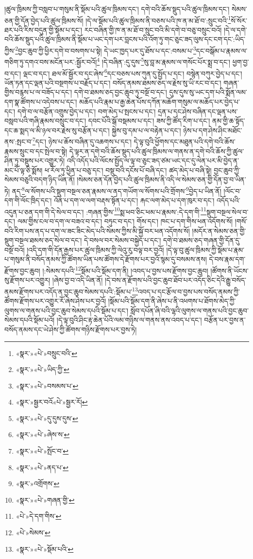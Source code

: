 །ཚུལ་ཁྲིམས་ཀྱི་བསླབ་པ་གསུམ་ནི་སྡོམ་པའི་ཚུལ་ཁྲིམས་དང་། དགེ་བའི་ཆོས་སྡུད་པའི་ཚུལ་ཁྲིམས་དང་། སེམས་ཅན་གྱི་དོན་བྱེད་པའི་ཚུལ་ཁྲིམས་སོ། །དེ་ལ་སྡོམ་པའི་ཚུལ་ཁྲིམས་ནི་བཅས་པའི་ཁ་ན་མ་ཐོ་བ་:སྲུང་བའི་\footnote{«སྣར་»«པེ་»བསྲུང་བའི་}སོ་སོར་ཐར་པའི་རིས་བདུན་གྱི་སྡོམ་པ་དང་། རང་བཞིན་གྱི་ཁ་ན་མ་ཐོ་བ་སྲུང་བའི་མི་དགེ་བ་བཅུ་བསྲུང་བའོ། །དེ་ལ་དགེ་བའི་ཆོས་སྡུད་པའི་ཚུལ་ཁྲིམས་ནི་སྡོམ་པ་ཡང་དག་པར་བླངས་པའི་འོག་ཏུ་གང་ཅུང་ཟད་ལུས་དང་ངག་དང་:ཡིད་ཀྱིས་\footnote{«སྣར་»«པེ་»ཡིད་ཀྱི་}བྱང་ཆུབ་ཀྱི་ཕྱིར་དགེ་བ་བསགས་པ་སྟེ། དེ་ཡང་ཁྱད་པར་དུ་ཐོས་པ་དང་:བསམ་པ་\footnote{«སྣར་»«པེ་»བསམས་པ་}དང་བསྒོམ་པ་རྣམས་ལ་གཅིག་ཏུ་དགའ་བས་མངོན་པར་:སྦྱོར་བའོ།\footnote{«སྣར་»སྦྱར་བའོ«པེ་»སྦྱར་རོ།} །དེ་བཞིན་:དུ་དུས་\footnote{«སྣར་»«པེ་»དུ་དུས་དུས་}སུ་བླ་མ་རྣམས་ལ་གསོང་པོར་སྨྲ་བ་དང་། ཕྱག་བྱ་བ་དང་། ལྡང་བ་དང་། ཐལ་མོ་སྦྱོར་བ་དང་ཞེས་\footnote{«སྣར་»«པེ་»ཞེས་ས་}དང་བཅས་པས་ཀུན་དུ་སྤྱོད་པ་དང་། བསྙེན་བཀུར་བྱེད་པ་དང་། ཡོན་ཏན་དང་ལྡན་པའི་བསྔགས་པ་བརྗོད་པ་དང་། བསོད་ནམས་ཐམས་ཅད་ལ་རྗེས་སུ་ཡི་རང་བ་དང་། གཞན་གྱིས་བརྙས་པ་ལ་བཟོད་པ་དང་། དགེ་བ་ཐམས་ཅད་བྱང་ཆུབ་ཏུ་བསྔོ་བ་དང་། དུས་དུས་སུ་ཡང་དག་པའི་སྨོན་ལམ་དག་སྣ་ཚོགས་པ་འདེབས་པ་དང་། མཆོད་པའི་རྣམ་པ་རྒྱ་ཆེན་པོས་དཀོན་མཆོག་གསུམ་ལ་མཆོད་པར་བྱེད་པ་དང་། དགེ་བ་ལ་བརྩོན་འགྲུས་བྱེད་པ་དང་། བག་མེད་པ་སྤངས་པ་དང་། དྲན་པ་དང་ཤེས་བཞིན་དང་ལྡན་པས་བསླབ་པའི་གཞི་རྣམས་བསྲུང་བ་དང་། དབང་པོའི་སྒོ་བསྡམས་པ་དང་། ཟས་ཀྱི་ཚོད་རིག་པ་དང་། ནམ་གྱི་ཆ་སྟོད་དང་ཆ་སྨད་ལ་མི་ཉལ་བར་རྗེས་སུ་བརྩོན་པ་དང་། སྐྱེས་བུ་དམ་པ་ལ་བརྟེན་པ་དང་། ཉེས་པ་དག་ཤེས་ཤིང་མཐོང་ནས་:སྤང་བ་\footnote{«སྣར་»«པེ་»སྤོང་བ་}དང་། ཉེས་པ་ཆོས་བཞིན་དུ་འཆགས་པ་དང་། དེ་ལྟ་བུའི་ཕྱོགས་དང་མཐུན་པའི་དགེ་བའི་ཆོས་རྣམས་སྲུང་བ་དང་སྤེལ་བ་སྟེ། དེ་ལྟར་ན་དགེ་བའི་ཆོས་སྡུད་པའི་ཚུལ་ཁྲིམས་ལ་གནས་ན་དགེ་བའི་ཆོས་ཀྱི་ཚུལ་ཤིན་ཏུ་བསྡུས་པར་འགྱུར་ཏེ། འདི་འདོད་པའི་ལོངས་སྤྱོད་ལ་ལྟ་བ་ཅུང་ཟད་ཙམ་ཡང་དང་དུ་ལེན་པར་མི་བྱེད་ན་མང་པོ་ལྟ་ཅི་སྨོས། ཕ་རོལ་ཏུ་ཕྱིན་པ་བཅུ་དང་། བསྡུ་བའི་དངོས་པོ་བཞི་དང་། ཚད་མེད་པ་བཞི་སྟེ། བྱང་ཆུབ་ཀྱི་སེམས་བཅུའི་བདག་ཉིད་ཡིན་ནོ། །སེམས་ཅན་དོན་བྱེད་པའི་ཚུལ་ཁྲིམས་ནི་འདི་ལ་སེམས་ཅན་གྱི་དོན་བྱ་བ་ཡིན་ཏེ། ནད་\footnote{«སྣར་»«པེ་»ནད་པ་}ལ་སོགས་པའི་སྡུག་བསྔལ་ཅན་རྣམས་ལ་ནད་གཡོག་ལ་སོགས་པའི་གྲོགས་\footnote{«སྣར་»འགྲོགས་}བྱེད་པ་ཡིན་ནོ། །ལོང་བ་དག་གི་ལོང་ཁྲིད་དང་། འོན་པ་དག་ལ་ལག་བརྡས་སྟོན་པ་དང་། རྐང་ལག་མེད་པ་དག་ཁུར་བ་དང་། འདོད་པའི་འདུན་པ་ཅན་དག་གི་དེ་སེལ་བ་དང་། :གཞན་གྱིས་\footnote{«སྣར་»«པེ་»གཞན་གྱི་}སྨ་ཕབ་ཅིང་ཕམ་པ་རྣམས་:དེ་དག་གི་\footnote{«པེ་»དེ་དག་གིས་}སྡུག་བསྔལ་སེལ་བ་དང་། ལམ་གྱིས་ངལ་བ་དག་ལ་བཟའ་བ་དང་། བཏུང་བ་དང་། གོས་དང་། ཁང་པ་དག་གིས་ཕན་འདོགས་སོ། །གསོ་བའི་རིག་པས་ནད་པ་དག་ལ་ཟང་ཟིང་མེད་པའི་སེམས་ཀྱིས་མི་སྐྱོ་བར་ཕན་འདོགས་སོ། །མདོར་ན་སེམས་ཅན་གྱི་སྡུག་བསྔལ་ཐམས་ཅད་སེལ་བ་དང་། དེ་བསལ་བར་སེམས་བསྐྱེད་པ་དང་། དགེ་བ་ཐམས་ཅད་གཞན་གྱི་དོན་དུ་བསྔོ་བའོ། །འདི་དག་གི་དོན་རྒྱས་པར་ཚུལ་ཁྲིམས་ཀྱི་ལེའུ་རུ་བལྟ་བར་བྱའོ། །དེ་ལྟ་བུ་ཚུལ་ཁྲིམས་ཀྱི་སྡོམ་པ་རྣམ་པ་གསུམ་ནི་བསོད་ནམས་ཀྱི་ཚོགས་ཡིན་པས་ཚོགས་དེ་རྫོགས་པར་བྱའོ་སྙམ་དུ་བསམས་ནས། དེ་བས་རྣམ་དག་རྫོགས་བྱང་ཆུབ། །:སེམས་དཔའི་\footnote{«པེ་»སེམས་}སྡོམ་པའི་སྡོམ་དག་ནི། །འབད་པ་བྱས་པས་རྫོགས་བྱང་ཆུབ། །ཚོགས་ནི་ཡོངས་སུ་རྫོགས་པར་འགྱུར། །ཞེས་བྱ་བ་འདི་ཡིན་ནོ། །དེ་བས་ན་རྫོགས་པའི་བྱང་ཆུབ་ཐོབ་པར་འདོད་ཅིང་དེའི་རྒྱུ་བསོད་ནམས་རྫོགས་པར་འདོད་ན་བྱང་ཆུབ་སེམས་དཔའི་:སྡོམ་པ་\footnote{«སྣར་»«པེ་»སྡོམ་པའི་}འབད་པ་དང་རྩོལ་བ་བྱས་པས་བསོད་ནམས་ཀྱི་ཚོགས་རྫོགས་པར་འགྱུར་རོ་ཞེས་ཤེས་པར་བྱའོ། །སྡོམ་པའི་སྡོམ་དག་ནི་ཞེས་པ་ནི་འཕགས་པ་ཐོགས་མེད་ཀྱི་ལུགས་ལ་གནས་པའི་བྱང་ཆུབ་སེམས་དཔའི་སྡོམ་པ་དང་། སློབ་དཔོན་ཞི་བའི་ལྷའི་ལུགས་ལ་གནས་པའི་བྱང་ཆུབ་སེམས་དཔའི་སྡོམ་པའོ། །དེ་ལྟ་བུའི་ཤིང་རྟ་ཆེན་པོའི་ལམ་གཉིས་ལ་གནས་ནས་འབད་པ་དང་། བརྩོན་པར་བྱས་ན་བསོད་ནམས་དང་ཡེ་ཤེས་ཀྱི་ཚོགས་གཉིས་རྫོགས་པར་བྱས་ཏེ། 